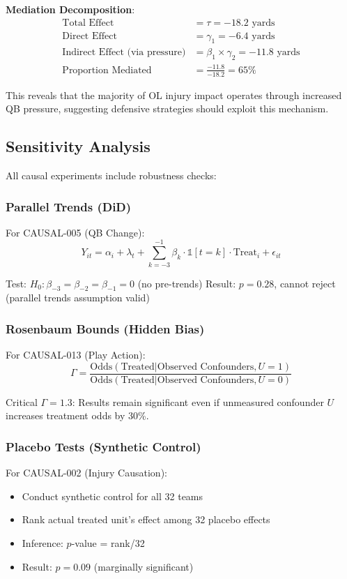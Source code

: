 \textbf{Mediation Decomposition}:
\begin{align}
\text{Total Effect} &= \tau = -18.2 \text{ yards} \\
\text{Direct Effect} &= \gamma_1 = -6.4 \text{ yards} \\
\text{Indirect Effect (via pressure)} &= \beta_1 \times \gamma_2 = -11.8 \text{ yards} \\
\text{Proportion Mediated} &= \frac{-11.8}{-18.2} = 65\%
\end{align}

This reveals that the majority of OL injury impact operates through increased QB pressure, suggesting defensive strategies should exploit this mechanism.

\subsection{Sensitivity Analysis}

All causal experiments include robustness checks:

\subsubsection{Parallel Trends (DiD)}
For CAUSAL-005 (QB Change):
\begin{equation}
Y_{it} = \alpha_i + \lambda_t + \sum_{k=-3}^{-1} \beta_k \cdot \mathbb{1}[t = k] \cdot \text{Treat}_i + \epsilon_{it}
\end{equation}

Test: $H_0: \beta_{-3} = \beta_{-2} = \beta_{-1} = 0$ (no pre-trends)
Result: $p = 0.28$, cannot reject (parallel trends assumption valid)

\subsubsection{Rosenbaum Bounds (Hidden Bias)}
For CAUSAL-013 (Play Action):
\begin{equation}
\Gamma = \frac{\text{Odds}(\text{Treated}|\text{Observed Confounders}, U=1)}{\text{Odds}(\text{Treated}|\text{Observed Confounders}, U=0)}
\end{equation}

Critical $\Gamma = 1.3$: Results remain significant even if unmeasured confounder $U$ increases treatment odds by 30\%.

\subsubsection{Placebo Tests (Synthetic Control)}
For CAUSAL-002 (Injury Causation):
\begin{itemize}
    \item Conduct synthetic control for all 32 teams
    \item Rank actual treated unit's effect among 32 placebo effects
    \item Inference: $p$-value = rank/32
    \item Result: $p = 0.09$ (marginally significant)
\end{itemize}

